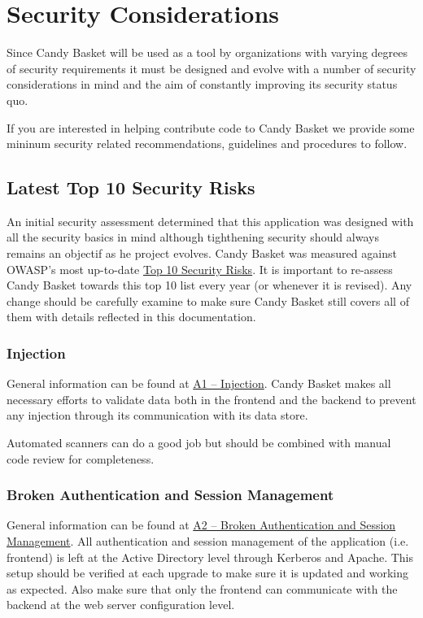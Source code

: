 \documentclass[letterpaper,10pt,english]{sphinxmanual}
\begin{document}
\section{Security Considerations}
\label{developer-guide:security}\label{developer-guide:security-considerations}
Since Candy Basket will be used as a tool by organizations with
varying degrees of security requirements it must be designed and
evolve with a number of security considerations in mind and the aim of
constantly improving its security status quo.

If you are interested in helping contribute code to Candy Basket we
provide some mininum security related recommendations, guidelines and
procedures to follow.


\subsection{Latest Top 10 Security Risks}
\label{developer-guide:latest-top-10-security-risks}
An initial security assessment determined that this application was
designed with all the security basics in mind although tighthening
security should always remains an objectif as he project
evolves. Candy Basket was measured against OWASP's most up-to-date
\href{https://owasp.org/index.php/Top\_10\_2013-Table\_of\_Contents}{Top 10 Security Risks}. It is
important to re-assess Candy Basket towards this top 10 list every
year (or whenever it is revised). Any change should be carefully
examine to make sure Candy Basket still covers all of them
with details reflected in this documentation.


\subsubsection{Injection}
\label{developer-guide:injection}
General information can be found at \href{https://owasp.org/index.php/Top\_10\_2013-A1-Injection}{A1 -- Injection}. Candy Basket
makes all necessary efforts to validate data both in the frontend and
the backend to prevent any injection through its communication with
its data store.

Automated scanners can do a good job but should be combined with
manual code review for completeness.


\subsubsection{Broken Authentication and Session Management}
\label{developer-guide:broken-authentication-and-session-management}
General information can be found at \href{https://owasp.org/index.php/Top\_10\_2013-A2-Broken\_Authentication\_and\_Session\_Management}{A2 -- Broken Authentication and
Session Management}. All
authentication and session management of the application
(i.e. frontend) is left at the Active Directory level through Kerberos
and Apache. This setup should be verified at each upgrade to make sure
it is updated and working as expected. Also make sure that only the
frontend can communicate with the backend at the web server
configuration level.
\end{document}
